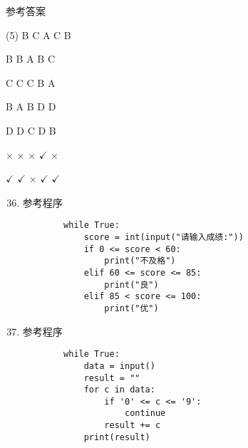 \documentclass[11pt]{ctexart}
\begin{document}
\begin{center}
    \Huge \heiti 参考答案
\end{center}

    \begin{tasks}[label=\arabic*.](5)
        \task B
        \task C
        \task A
        \task C
        \task B

        \task B
        \task B
        \task A
        \task B
        \task C

        \task C
        \task C
        \task C
        \task B
        \task A

        \task B
        \task A
        \task B
        \task D
        \task D

        \task D
        \task D
        \task C
        \task D
        \task B

        \task $\times$
        \task $\times$
        \task $\times$
        \task $\checkmark$
        \task $\times$

        \task $\checkmark$
        \task $\checkmark$
        \task $\times$
        \task $\checkmark$
        \task $\checkmark$
    \end{tasks}

\begin{enumerate}
    \setcounter{enumi}{35}
    \item 参考程序
    \begin{lstlisting}
        while True:
            score = int(input("请输入成绩:"))
            if 0 <= score < 60:
                print("不及格")
            elif 60 <= score <= 85:
                print("良")
            elif 85 < score <= 100:
                print("优")
    \end{lstlisting}

    \item 参考程序
    \begin{lstlisting}
        while True:
            data = input()
            result = ""
            for c in data:
                if '0' <= c <= '9':
                    continue
                result += c
            print(result)
    \end{lstlisting}
\end{enumerate}
\end{document}
